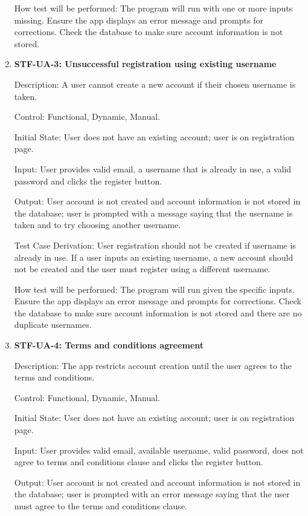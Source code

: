 \documentclass[12pt, titlepage]{article}
\begin{document}
\begin{enumerate}
How test will be performed: The program will run with one or more inputs missing. Ensure the app displays an error message and prompts for corrections. Check the database to make sure account information is not stored.

\item{\textbf{STF-UA-3: Unsuccessful registration using existing username}\\}

Description: A user cannot create a new account if their chosen username is taken.

Control:  Functional, Dynamic, Manual.

Initial State: User does not have an existing account; user is on registration page.

Input: User provides valid email, a username that is already in use, a valid password and clicks the register button.

Output: User account is not created and account information is not stored in the database; user is prompted with a message saying that the username is taken and to try choosing another username.

Test Case Derivation: User registration should not be created if username is already in use. If a user inputs an existing username, a new account should not be created and the user must register using a different username.

How test will be performed: The program will run given the specific inputs. Ensure the app displays an error message and prompts for corrections. Check the database to make sure account information is not stored and there are no duplicate usernames.

\item{\textbf{STF-UA-4: Terms and conditions agreement}\\}

Description: The app restricts account creation until the user agrees to the terms and conditions.

Control: Functional, Dynamic, Manual.

Initial State: User does not have an existing account; user is on registration page. 

Input: User provides valid email, available username, valid password, does not agree to terms and conditions clause and clicks the register button.

Output: User account is not created and account information is not stored in the database; user is prompted with an error message saying that the user must agree to the terms and conditions clause.


\end{enumerate}
\end{document}
